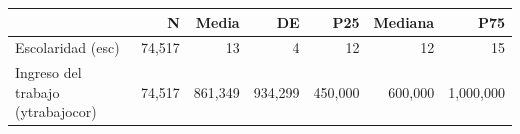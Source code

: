 \begin{table}
\centering
\begin{tabular}[t]{lrrrrrr}
\toprule
  & N & Media & DE & P25 & Mediana & P75\\
\midrule
Escolaridad (esc) & 74,517 & 13 & 4 & 12 & 12 & 15\\
Ingreso del trabajo (ytrabajocor) & 74,517 & 861,349 & 934,299 & 450,000 & 600,000 & 1,000,000\\
\bottomrule
\end{tabular}
\end{table}
